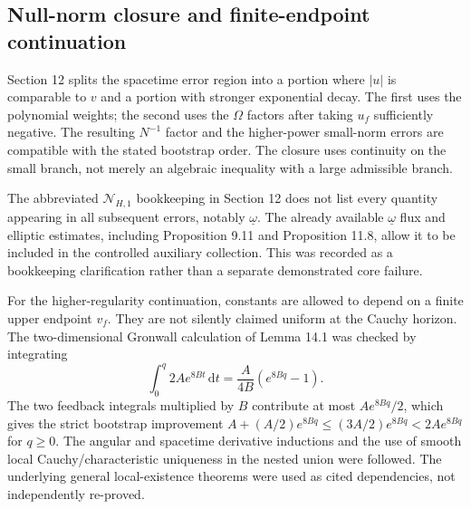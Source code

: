 \documentclass[10pt]{article}
\begin{document}
\subsection*{Null-norm closure and finite-endpoint continuation}
Section 12 splits the spacetime error region into a portion where \(|u|\) is comparable to \(v\) and a portion with stronger exponential decay. The first uses the polynomial weights; the second uses the \(\Omega\) factors after taking \(u_f\) sufficiently negative. The resulting \(N^{-1}\) factor and the higher-power small-norm errors are compatible with the stated bootstrap order. The closure uses continuity on the small branch, not merely an algebraic inequality with a large admissible branch.\par
The abbreviated \(\mathcal N_{H,1}\) bookkeeping in Section 12 does not list every quantity appearing in all subsequent errors, notably \(\underline\omega\). The already available \(\underline\omega\) flux and elliptic estimates, including Proposition 9.11 and Proposition 11.8, allow it to be included in the controlled auxiliary collection. This was recorded as a bookkeeping clarification rather than a separate demonstrated core failure.\par
For the higher-regularity continuation, constants are allowed to depend on a finite upper endpoint \(v_f\). They are not silently claimed uniform at the Cauchy horizon. The two-dimensional Gronwall calculation of Lemma 14.1 was checked by integrating \[\int_0^q 2A e^{8Bt}\,\mathrm dt
       =\frac{A}{4B}(e^{8Bq}-1).\] The two feedback integrals multiplied by \(B\) contribute at most \(A e^{8Bq}/2\), which gives the strict bootstrap improvement \(A+(A/2)e^{8Bq}\leq (3A/2)e^{8Bq}<2Ae^{8Bq}\) for \(q\geq0\). The angular and spacetime derivative inductions and the use of smooth local Cauchy/characteristic uniqueness in the nested union were followed. The underlying general local-existence theorems were used as cited dependencies, not independently re-proved.\par
\end{document}
